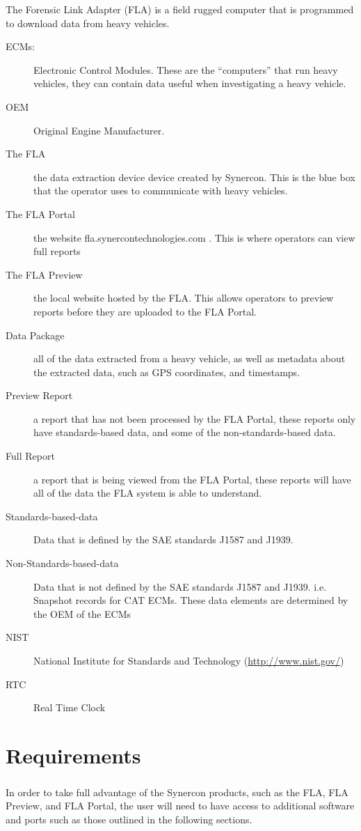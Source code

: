 \documentclass[11pt, oneside]{book}
\begin{document}
The Forensic Link Adapter (FLA) is a field rugged computer that is programmed to download data from heavy vehicles.
\begin{description}
\item [{ECMs:}] Electronic Control Modules. These are the ``computers''
that run heavy vehicles, they can contain data useful when investigating
a heavy vehicle.
\item [{OEM}] Original Engine Manufacturer.
\item [{The FLA}] the data extraction device device created by Synercon.
This is the blue box that the operator uses to communicate with heavy
vehicles.
\item [{The FLA Portal}] the website fla.synercontechnologies.com . This
is where operators can view full reports
\item [{The FLA Preview}] the local website hosted by the FLA. This allows
operators to preview reports before they are uploaded to the FLA Portal.
\item [{Data Package}] all of the data extracted from a heavy vehicle,
as well as metadata about the extracted data, such as GPS coordinates,
and timestamps.
\item [{Preview Report}] a report that has not been processed by the FLA
Portal, these reports only have standards-based data, and some of
the non-standards-based data.
\item [{Full Report}] a report that is being viewed from the FLA Portal,
these reports will have all of the data the FLA system is able to
understand.
\item [{Standards-based-data}] Data that is defined by the SAE standards
J1587 and J1939.
\item [{Non-Standards-based-data}] Data that is not defined by the SAE
standards J1587 and J1939. i.e. Snapshot records for CAT ECMs. These
data elements are determined by the OEM of the ECMs
\item [{NIST}] National Institute for Standards and Technology (\href{http://www.nist.gov/}{http://www.nist.gov/})
\item [{RTC}] Real Time Clock
\end{description}

\chapter{Requirements}
\paragraph{  }
In order to take full advantage of the Synercon products, such as
the FLA, FLA Preview, and FLA Portal, the user will need to have access to additional software and ports such as those outlined in the following sections.
\end{document}
